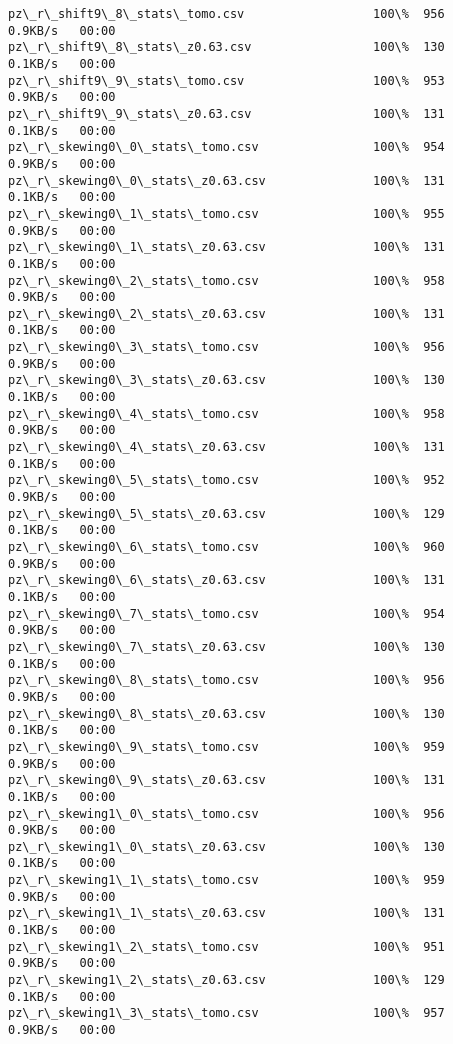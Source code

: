 \documentclass[11pt]{article}
\begin{document}
\begin{Verbatim}[commandchars=\\\{\}]
pz\_r\_shift9\_8\_stats\_tomo.csv                  100\%  956     0.9KB/s   00:00    
pz\_r\_shift9\_8\_stats\_z0.63.csv                 100\%  130     0.1KB/s   00:00    
pz\_r\_shift9\_9\_stats\_tomo.csv                  100\%  953     0.9KB/s   00:00    
pz\_r\_shift9\_9\_stats\_z0.63.csv                 100\%  131     0.1KB/s   00:00    
pz\_r\_skewing0\_0\_stats\_tomo.csv                100\%  954     0.9KB/s   00:00    
pz\_r\_skewing0\_0\_stats\_z0.63.csv               100\%  131     0.1KB/s   00:00    
pz\_r\_skewing0\_1\_stats\_tomo.csv                100\%  955     0.9KB/s   00:00    
pz\_r\_skewing0\_1\_stats\_z0.63.csv               100\%  131     0.1KB/s   00:00    
pz\_r\_skewing0\_2\_stats\_tomo.csv                100\%  958     0.9KB/s   00:00    
pz\_r\_skewing0\_2\_stats\_z0.63.csv               100\%  131     0.1KB/s   00:00    
pz\_r\_skewing0\_3\_stats\_tomo.csv                100\%  956     0.9KB/s   00:00    
pz\_r\_skewing0\_3\_stats\_z0.63.csv               100\%  130     0.1KB/s   00:00    
pz\_r\_skewing0\_4\_stats\_tomo.csv                100\%  958     0.9KB/s   00:00    
pz\_r\_skewing0\_4\_stats\_z0.63.csv               100\%  131     0.1KB/s   00:00    
pz\_r\_skewing0\_5\_stats\_tomo.csv                100\%  952     0.9KB/s   00:00    
pz\_r\_skewing0\_5\_stats\_z0.63.csv               100\%  129     0.1KB/s   00:00    
pz\_r\_skewing0\_6\_stats\_tomo.csv                100\%  960     0.9KB/s   00:00    
pz\_r\_skewing0\_6\_stats\_z0.63.csv               100\%  131     0.1KB/s   00:00    
pz\_r\_skewing0\_7\_stats\_tomo.csv                100\%  954     0.9KB/s   00:00    
pz\_r\_skewing0\_7\_stats\_z0.63.csv               100\%  130     0.1KB/s   00:00    
pz\_r\_skewing0\_8\_stats\_tomo.csv                100\%  956     0.9KB/s   00:00    
pz\_r\_skewing0\_8\_stats\_z0.63.csv               100\%  130     0.1KB/s   00:00    
pz\_r\_skewing0\_9\_stats\_tomo.csv                100\%  959     0.9KB/s   00:00    
pz\_r\_skewing0\_9\_stats\_z0.63.csv               100\%  131     0.1KB/s   00:00    
pz\_r\_skewing1\_0\_stats\_tomo.csv                100\%  956     0.9KB/s   00:00    
pz\_r\_skewing1\_0\_stats\_z0.63.csv               100\%  130     0.1KB/s   00:00    
pz\_r\_skewing1\_1\_stats\_tomo.csv                100\%  959     0.9KB/s   00:00    
pz\_r\_skewing1\_1\_stats\_z0.63.csv               100\%  131     0.1KB/s   00:00    
pz\_r\_skewing1\_2\_stats\_tomo.csv                100\%  951     0.9KB/s   00:00    
pz\_r\_skewing1\_2\_stats\_z0.63.csv               100\%  129     0.1KB/s   00:00    
pz\_r\_skewing1\_3\_stats\_tomo.csv                100\%  957     0.9KB/s   00:00    

\end{Verbatim}
\end{document}
